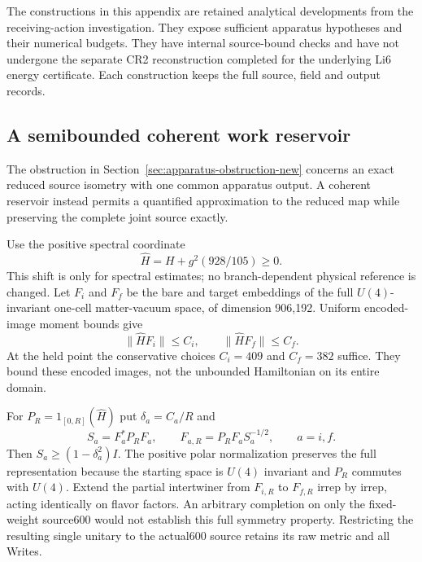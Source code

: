 \label{app:apparatus}

The constructions in this appendix are retained analytical developments
from the receiving-action investigation. They expose sufficient apparatus
hypotheses and their numerical budgets. They have internal source-bound
checks and have not undergone the separate CR2 reconstruction completed for
the underlying Li6 energy certificate. Each construction keeps the full
source, field and output records.

\subsection{A semibounded coherent work reservoir}

The obstruction in Section~\ref{sec:apparatus-obstruction-new} concerns an
exact reduced source isometry with one common apparatus output. A coherent
reservoir instead permits a quantified approximation to the reduced map
while preserving the complete joint source exactly.

Use the positive spectral coordinate
\begin{equation}
\widehat H=H+g^2(928/105)\geq0.
\end{equation}
This shift is only for spectral estimates; no branch-dependent physical
reference is changed. Let $F_i$ and $F_f$ be the bare and target embeddings
of the full $U(4)$-invariant one-cell matter-vacuum space, of dimension
906,192. Uniform encoded-image moment bounds give
\begin{equation}
\|\widehat HF_i\|\leq C_i,\qquad
\|\widehat HF_f\|\leq C_f.
\end{equation}
At the held point the conservative choices $C_i=409$ and $C_f=382$ suffice.
They bound these encoded images, not the unbounded Hamiltonian on its
entire domain.

For $P_R=1_{[0,R]}(\widehat H)$ put $\delta_a=C_a/R$ and
\begin{equation}
S_a=F_a^*P_RF_a,\qquad
F_{a,R}=P_RF_aS_a^{-1/2},\qquad a=i,f.
\end{equation}
Then $S_a\geq(1-\delta_a^2)I$. The positive polar normalization preserves
the full representation because the starting space is $U(4)$ invariant
and $P_R$ commutes with $U(4)$. Extend the partial intertwiner from
$F_{i,R}$ to $F_{f,R}$ irrep by irrep, acting identically on flavor factors.
An arbitrary completion on only the fixed-weight source600 would not
establish this full symmetry property. Restricting the resulting single
unitary to the actual600 source retains its raw metric and all Writes.

